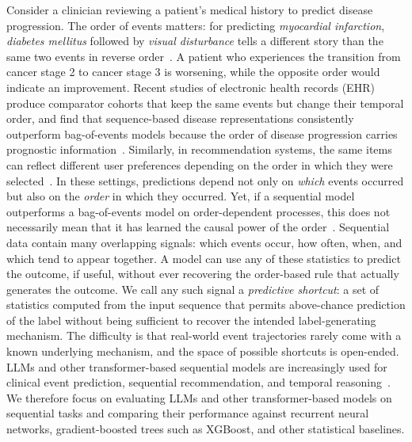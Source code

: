 \documentclass{article} %
\theoremstyle{plain}
\theoremstyle{definition}
\theoremstyle{remark}
\begin{document}
Consider a clinician reviewing a patient's medical history to predict disease progression. The order of events matters: for predicting \textit{myocardial infarction}, \textit{diabetes mellitus} followed by \textit{visual disturbance} tells a different story than the same two events in reverse order~\citep{edelman2026order_specific_ehr}. 
A patient who experiences the transition from cancer stage 2 to cancer stage 3 is worsening, while the opposite order would indicate an improvement. 
Recent studies of electronic health records (EHR) produce comparator cohorts that keep the same events but change their temporal order, and find that sequence-based disease representations consistently outperform bag-of-events models because the order of disease progression carries prognostic information~\citep{edelman2026order_specific_ehr,beaney2024coded_disease_representations,placido2023pancreatic_trajectories,pollington2026trajectory_review}. Similarly, in recommendation systems, the same items can reflect different user preferences depending on the order in which they were selected~\citep{kimLostSequenceLarge2025b}. In these settings, predictions depend not only on \emph{which} events occurred but also on the \emph{order} in which they occurred. Yet, if a sequential model outperforms a bag-of-events model on order-dependent processes, this does not necessarily mean that it has learned the causal power of the order~\citep{geirhos2020shortcut,mccoy2019right}. Sequential data contain many overlapping signals: which events occur, how often, when, and which tend to appear together. A model can use any of these statistics to predict the outcome, if useful, without ever recovering the order-based rule that actually generates the outcome. We call any such signal a \emph{predictive shortcut}: a set of statistics computed from the input sequence that permits above-chance prediction of the label without being sufficient to recover the intended label-generating mechanism. The difficulty is that real-world event trajectories rarely come with a known underlying mechanism, and the space of possible shortcuts is open-ended. LLMs and other transformer-based sequential models are increasingly used for clinical event prediction, sequential recommendation, and temporal reasoning~\citep{savcisens2024using,delphi2025transformer,li2020behrt,rasmy2021medbert,fatemiTESTTIMEBENCHMARK2025}. We therefore focus on evaluating LLMs and other transformer-based models on sequential tasks and comparing their performance against recurrent neural networks, gradient-boosted trees such as XGBoost, and other statistical baselines.
\end{document}
